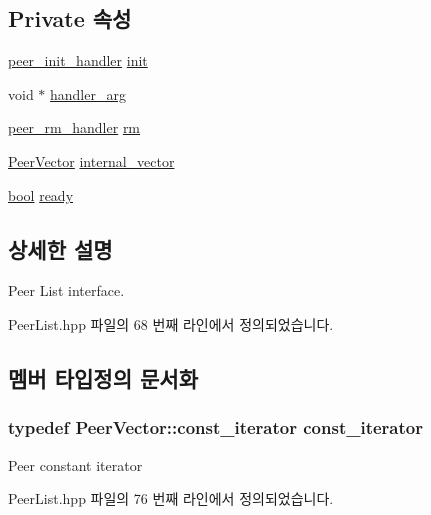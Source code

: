 \subsection*{Private 속성}
\begin{DoxyCompactItemize}
\item 
\hyperlink{_peer_list_8hpp_a08d52dcdc07d2bec302be1b8e2718c8f}{peer\+\_\+init\+\_\+handler} \hyperlink{class_peer_list_a16f86d3255eb28f02dcaf5768e203b62}{init}
\item 
void $\ast$ \hyperlink{class_peer_list_aee326623b9b841369cb4766c195f570a}{handler\+\_\+arg}
\item 
\hyperlink{_peer_list_8hpp_a276ac0f57f4dc8f2b64efa93ccb167c2}{peer\+\_\+rm\+\_\+handler} \hyperlink{class_peer_list_a9958b92a85d1751a7bdfac8c5fd4ea96}{rm}
\item 
\hyperlink{_peer_list_8hpp_af01ba2c06a6a86dfa46172e5ac664357}{Peer\+Vector} \hyperlink{class_peer_list_af3621b78fcd5c27e1653da3e543f9438}{internal\+\_\+vector}
\item 
\hyperlink{avb__gptp_8h_af6a258d8f3ee5206d682d799316314b1}{bool} \hyperlink{class_peer_list_a65cf7d7f8e531611b245355ab91fd749}{ready}
\end{DoxyCompactItemize}


\subsection{상세한 설명}
Peer List interface. 

Peer\+List.\+hpp 파일의 68 번째 라인에서 정의되었습니다.



\subsection{멤버 타입정의 문서화}
\subsubsection[{\texorpdfstring{const\+\_\+iterator}{const_iterator}}]{\setlength{\rightskip}{0pt plus 5cm}typedef Peer\+Vector\+::const\+\_\+iterator {\bf const\+\_\+iterator}}\hypertarget{class_peer_list_a8f607ed0489ad703402dd51ac142b251}{}\label{class_peer_list_a8f607ed0489ad703402dd51ac142b251}
Peer constant iterator 

Peer\+List.\+hpp 파일의 76 번째 라인에서 정의되었습니다.

